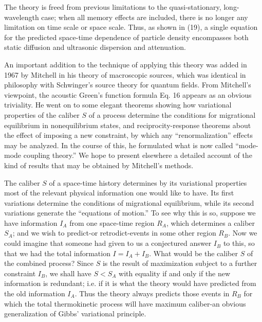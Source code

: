 \documentclass{article}
\begin{document}
The theory is freed from previous limitations to the quasi-stationary, long-wavelength case; when all memory effects are included, there is no longer any limitation on time scale or space scale. Thus, as shown in (19), a single equation for the predicted space-time dependence of particle density encompasses both static diffusion and ultrasonic dispersion and attenuation.

An important addition to the technique of applying this theory was added in 1967 by Mitchell \cite{mitchell1967} in his theory of macroscopic sources, which was identical in philosophy with Schwinger's source theory for quantum fields. From Mitchell's viewpoint, the acoustic Green's function formula Eq. 16 appears as an obvious triviality. He went on to some elegant theorems showing how variational properties of the caliber $S$ of a process determine the conditions for migrational equilibrium in nonequilibrium states, and reciprocity-response theorems about the effect of imposing a new constraint, by which any ``renormalization'' effects may be analyzed. In the course of this, he formulated what is now called ``mode-mode coupling theory.'' We hope to present elsewhere a detailed account of the kind of results that may be obtained by Mitchell's methods.

The caliber $S$ of a space-time history determines by its variational properties most of the relevant physical information one would like to have. Its first variations determine the conditions of migrational equilibrium, while its second variations generate the ``equations of motion.'' To see why this is so, suppose we have information $I_A$ from one space-time region $R_A$, which determines a caliber $S_A$; and we wish to predict-or retrodict-events in some other region $R_B$. Now we could imagine that someone had given to us a conjectured answer $I_B$ to this, so that we had the total information $I=I_A+I_B$. What would be the caliber $S$ of the combined process? Since $S$ is the result of maximization subject to a further constraint $I_B$, we shall have $S<S_A$ with equality if and only if the new information is redundant; i.e. if it is what the theory would have predicted from the old information $I_A$. Thus the theory always predicts those events in $R_B$ for which the total thermokinetic process will have maximum caliber-an obvious generalization of Gibbs' variational principle.
\end{document}
